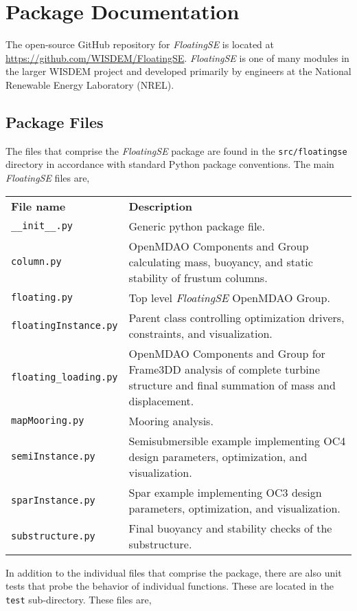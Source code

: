 \section{Package Documentation}
\label{sec:package}
The open-source GitHub repository for \textit{FloatingSE} is located at
\url{https://github.com/WISDEM/FloatingSE}.  \textit{FloatingSE} is one of many
modules in the larger WISDEM project and developed primarily by
engineers at the National Renewable Energy Laboratory (NREL).

\subsection{Package Files}
The files that comprise the \textit{FloatingSE} package are found in the
\texttt{src/floatingse} directory in accordance with standard Python
package conventions.  The main \textit{FloatingSE} files are,

{\small
  \begin{tabularx}{\linewidth}{ l X }
    \textbf{File name} & \textbf{Description} \\
\texttt{\_\_init\_\_.py} & Generic python package file.\\
\texttt{column.py} & OpenMDAO Components and Group calculating
  mass, buoyancy, and static stability of frustum columns.\\
\texttt{floating.py} & Top level \textit{FloatingSE} OpenMDAO Group.\\
\texttt{floatingInstance.py} & Parent class controlling
  optimization drivers, constraints, and visualization. \\
\texttt{floating\_loading.py} & OpenMDAO Components and Group for
  Frame3DD analysis of complete turbine structure and final summation of
  mass and displacement.\\
\texttt{mapMooring.py} & Mooring analysis.\\
\texttt{semiInstance.py} & Semisubmersible example implementing
  OC4 design parameters, optimization, and visualization.\\
\texttt{sparInstance.py} & Spar example implementing OC3 design
  parameters, optimization, and visualization.\\
\texttt{substructure.py} & Final buoyancy and stability checks of
  the substructure.\\
\end{tabularx}
}

In addition to the individual files that comprise the package, there are
also unit tests that probe the behavior of individual functions.  These
are located in the \texttt{test} sub-directory.  These files are,

